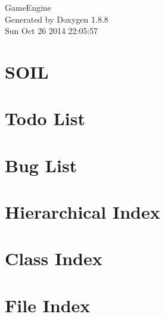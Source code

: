 \documentclass[twoside]{book}
\newcommand{\+}{\discretionary{\mbox{\scriptsize$\hookleftarrow$}}{}{}}
\newcommand{\clearemptydoublepage}{%
  \newpage{\pagestyle{empty}\cleardoublepage}%
}
\begin{document}
\begin{titlepage}
\vspace*{7cm}
\begin{center}%
{\Large Game\+Engine }\\
\vspace*{1cm}
{\large Generated by Doxygen 1.8.8}\\
\vspace*{0.5cm}
{\small Sun Oct 26 2014 22:05:57}\\
\end{center}
\end{titlepage}
\clearemptydoublepage
\tableofcontents
\clearemptydoublepage
{}

\chapter{S\+O\+I\+L}
\label{index}
\chapter{Todo List}
\label{dd/da0/todo}

\chapter{Bug List}
\label{de/da5/bug}

\chapter{Hierarchical Index}

\chapter{Class Index}

\chapter{File Index}

\end{document}
